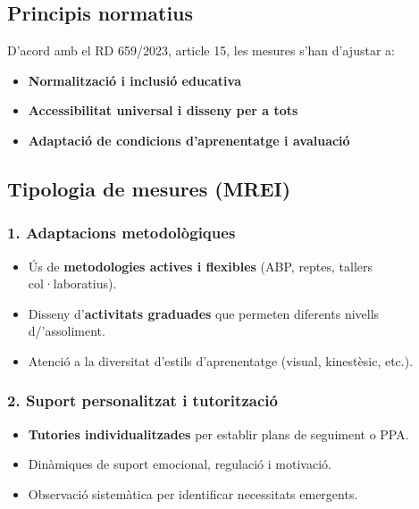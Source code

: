 \documentclass[
  paper=a4,
  ,captions=tableheading
]{scrartcl}
\providecommand{\tightlist}{%
  \setlength{\itemsep}{0pt}\setlength{\parskip}{0pt}}
\begin{document}
\hypertarget{principis-normatius}{%
\subsection{Principis normatius}\label{principis-normatius}}

D'acord amb el RD 659/2023, article 15, les mesures s'han d'ajustar a:

\begin{itemize}
\tightlist
\item
  \textbf{Normalització i inclusió educativa}
\item
  \textbf{Accessibilitat universal i disseny per a tots}
\item
  \textbf{Adaptació de condicions d'aprenentatge i avaluació}
\end{itemize}

\hypertarget{tipologia-de-mesures-mrei}{%
\subsection{Tipologia de mesures
(MREI)}\label{tipologia-de-mesures-mrei}}

\hypertarget{adaptacions-metodoluxf2giques}{%
\subsubsection{1. Adaptacions
metodològiques}\label{adaptacions-metodoluxf2giques}}

\begin{itemize}
\tightlist
\item
  Ús de \textbf{metodologies actives i flexibles} (ABP, reptes, tallers
  col·laboratius).
\item
  Disseny d'\textbf{activitats graduades} que permeten diferents nivells
  d/'assoliment.
\item
  Atenció a la diversitat d'estils d'aprenentatge (visual, kinestèsic,
  etc.).
\end{itemize}

\hypertarget{suport-personalitzat-i-tutoritzaciuxf3}{%
\subsubsection{2. Suport personalitzat i
tutorització}\label{suport-personalitzat-i-tutoritzaciuxf3}}

\begin{itemize}
\tightlist
\item
  \textbf{Tutories individualitzades} per establir plans de seguiment o
  PPA.
\item
  Dinàmiques de suport emocional, regulació i motivació.
\item
  Observació sistemàtica per identificar necessitats emergents.
\end{itemize}
\end{document}
